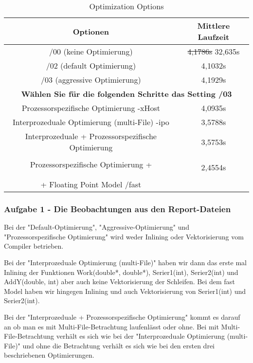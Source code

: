 \documentclass{article}
\begin{document}
\begin{table}[h]
\centering
\caption{Optimization Options}
\label{tab:aufgabe1}
\begin{tabular}{|c|c|}
\hline
\textbf{Optionen} & \textbf{Mittlere Laufzeit} \\
\hline
/00 (keine Optimierung) & \sout{4,1786s} 32,635s \\ 
\hline
/02 (default Optimierung) & 4,1032s \\
\hline
/03 (aggressive Optimierung) & 4,1929s \\
\hline
\multicolumn{2}{|c|}{\textbf{Wählen Sie für die folgenden Schritte das Setting /03}} \\
\hline
Prozessorspezifische Optimierung -xHost & 4,0935s \\
\hline
Interprozeduale Optimierung (multi-File) -ipo & 3,5788s \\
\hline
Interprozeduale + Prozessorspezifische Optimierung & 3,5753s \\
\hline
\multirow{3}{*}{Prozessorspezifische Optimierung + } &  \\
& \\  Interprozeduale Optimierung (multi-File) & 2,4554s \\
& \\  + Floating Point Model /fast & \\
\hline
\end{tabular}
\end{table}

\subsubsection{Aufgabe 1 - Die Beobachtungen aus den Report-Dateien}
Bei der "Default-Optimierung", "Aggressive-Optimierung" und "Prozessorspezifische Optimierung" wird
weder Inlining oder Vektorisierung vom Compiler betrieben.

Bei der "Interprozeduale Optimierung (multi-File)" haben wir dann das erste mal Inlining der
Funktionen Work(double*, double*), Serier1(int), Serier2(int) und AddY(double, int)
aber auch keine Vektorisierung der Schleifen.
Bei dem fast Model haben wir hingegen Inlining und auch Vektorisierung von Serier1(int)
und Serier2(int).

Bei der "Interprozeduale + Prozessorspezifische Optimierung" kommt es darauf an ob man es mit
Multi-File-Betrachtung laufenlässt oder ohne. Bei mit Multi-File-Betrachtung verhält es sich wie bei der
"Interprozeduale Optimierung (multi-File)" und ohne die Betrachtung verhält es sich wie bei den ersten
drei beschriebenen Optimierungen.
\end{document}
